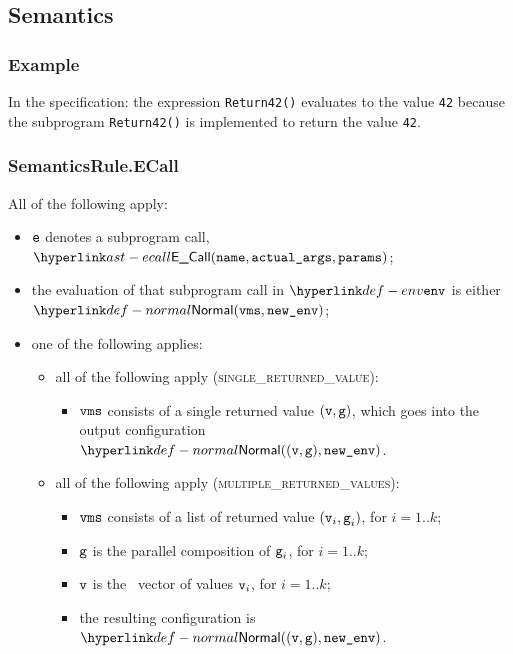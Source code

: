 \subsection{Semantics}
\subsubsection{Example}
In the specification:
the expression \texttt{Return42()} evaluates to the value \texttt{42} because the
subprogram \texttt{Return42()} is implemented to return the value \texttt{42}.

\subsubsection{SemanticsRule.ECall \label{sec:SemanticsRule.ECall}}
All of the following apply:
\begin{itemize}
  \item $\texttt{e}$ denotes a subprogram call, $\ECall(\name, \actualargs, \params)$;
  \item the evaluation of that subprogram call in $\env$ is either
  $\Normal(\vms, \newenv)$\ProseOrAbnormal;
  \item one of the following applies:
  \begin{itemize}
    \item all of the following apply (\textsc{single\_returned\_value}):
    \begin{itemize}
      \item $\texttt{vms}$ consists of a single returned value $(\texttt{v},\texttt{g})$,
      which goes into the output configuration $\Normal((\vv, \vg), \newenv)$.
    \end{itemize}

    \item all of the following apply (\textsc{multiple\_returned\_values}):
    \begin{itemize}
      \item $\texttt{vms}$ consists of a list of returned value $(\texttt{v}_i,\texttt{g}_i)$, for $i=1..k$;
      \item $\texttt{g}$ is the parallel composition of $\texttt{g}_i$, for $i=1..k$;
      \item $\texttt{v}$ is the \nativevalue\  vector of values $\texttt{v}_i$, for $i=1..k$;
      \item the resulting configuration is $\Normal((\vv, \vg), \newenv)$.
    \end{itemize}
  \end{itemize}
\end{itemize}

